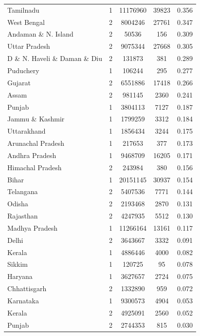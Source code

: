 \documentclass{article}
\begin{document}
\begin{table}[htbp]
\begin{tabular}{llSSS}
		    Tamilnadu & 1 & 11176960 & 39823 & 0.356 \\
		    West Bengal & 2 & 8004246 & 27761 & 0.347 \\
		    Andaman \& N. Island & 2 & 50536 & 156 & 0.309 \\
		    Uttar Pradesh & 2 & 9075344 & 27668 & 0.305 \\
		    D \& N. Haveli \& Daman \& Diu & 2 & 131873 & 381 & 0.289 \\
		    Puduchery & 1 & 106244 & 295 & 0.277 \\
		    Gujarat & 2 & 6551886 & 17418 & 0.266 \\
		    Assam & 2 & 981145 & 2360 & 0.241 \\
		    Punjab & 1 & 3804113 & 7127 & 0.187 \\
		    Jammu \& Kashmir & 1 & 1799259 & 3312 & 0.184 \\
		    Uttarakhand & 1 & 1856434 & 3244 & 0.175 \\
		    Arunachal Pradesh & 1 & 217653 & 377 & 0.173 \\
		    Andhra Pradesh & 1 & 9468709 & 16205 & 0.171 \\
		    Himachal Pradesh & 2 & 243984 & 380 & 0.156 \\
		    Bihar & 1 & 20151145 & 30937 & 0.154 \\
		    Telangana & 2 & 5407536 & 7771 & 0.144 \\
		    Odisha & 2 & 2193468 & 2870 & 0.131 \\
		    Rajasthan & 2 & 4247935 & 5512 & 0.130 \\
		    Madhya Pradesh & 1 & 11266164 & 13161 & 0.117 \\
		    Delhi & 2 & 3643667 & 3332 & 0.091 \\
		    Kerala & 1 & 4886446 & 4000 & 0.082 \\
		    Sikkim & 1 & 120725 & 95 & 0.078 \\
		    Haryana & 1 & 3627657 & 2724 & 0.075 \\
		    Chhattisgarh & 2 & 1332890 & 959 & 0.072 \\
		    Karnataka & 1 & 9300573 & 4904 & 0.053 \\
		    Kerala & 2 & 4925091 & 2560 & 0.052 \\
		    Punjab & 2 & 2744353 & 815 & 0.030 \\
			\bottomrule
		\end{tabular}
	\end{table}
	
\end{document}
